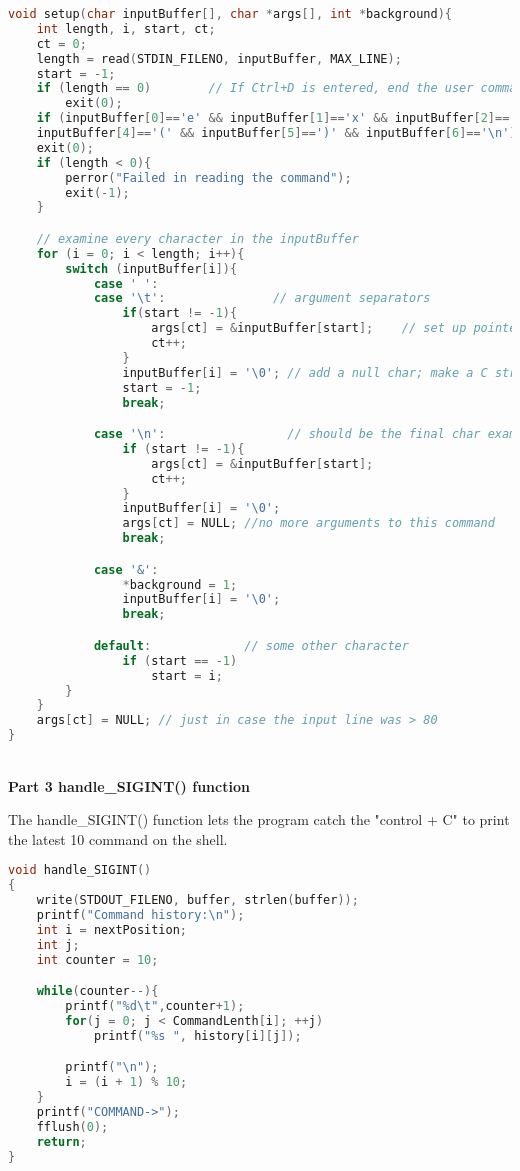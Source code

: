\documentclass[12pt,a4paper]{article}
\begin{document}
\begin{lstlisting}[language=C]
void setup(char inputBuffer[], char *args[], int *background){
    int length, i, start, ct;
    ct = 0;
    length = read(STDIN_FILENO, inputBuffer, MAX_LINE);
    start = -1;
    if (length == 0)        // If Ctrl+D is entered, end the user command stream 
        exit(0);
    if (inputBuffer[0]=='e' && inputBuffer[1]=='x' && inputBuffer[2]=='i' && inputBuffer[3]=='t' && 
    inputBuffer[4]=='(' && inputBuffer[5]==')' && inputBuffer[6]=='\n')
    exit(0);
    if (length < 0){
        perror("Failed in reading the command");
        exit(-1);
    }

    // examine every character in the inputBuffer
    for (i = 0; i < length; i++){
        switch (inputBuffer[i]){
            case ' ':
            case '\t':               // argument separators
                if(start != -1){
                    args[ct] = &inputBuffer[start];    // set up pointer
                    ct++;
                }
                inputBuffer[i] = '\0'; // add a null char; make a C string
                start = -1;
                break;

            case '\n':                 // should be the final char examined
                if (start != -1){
                    args[ct] = &inputBuffer[start];
                    ct++;
                }
                inputBuffer[i] = '\0';
                args[ct] = NULL; //no more arguments to this command
                break;

            case '&':
                *background = 1;
                inputBuffer[i] = '\0';
                break;

            default:             // some other character
                if (start == -1)
                    start = i;
        }
    }
    args[ct] = NULL; // just in case the input line was > 80
}
\end{lstlisting}
~\\
\textbf{Part 3 handle\_SIGINT() function}

The handle\_SIGINT() function lets the program catch the "control + C" to print the latest 10 command on the shell. 

\begin{lstlisting}[language=C]
void handle_SIGINT()
{
    write(STDOUT_FILENO, buffer, strlen(buffer));
    printf("Command history:\n");
    int i = nextPosition;
    int j;
    int counter = 10;

    while(counter--){
        printf("%d\t",counter+1);
        for(j = 0; j < CommandLenth[i]; ++j)
            printf("%s ", history[i][j]);

        printf("\n");
        i = (i + 1) % 10;
    }
    printf("COMMAND->");
    fflush(0);
    return;
}
\end{lstlisting}
\end{document}
